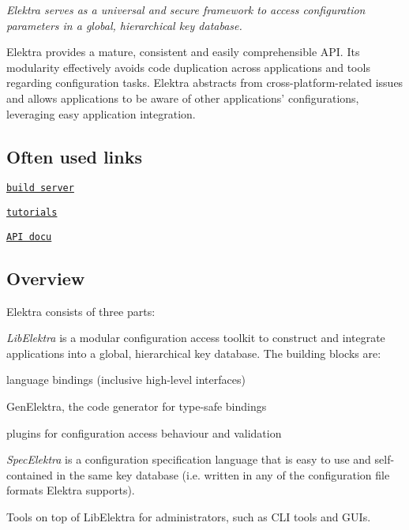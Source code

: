 {\itshape Elektra serves as a universal and secure framework to access configuration parameters in a global, hierarchical key database.}



Elektra provides a mature, consistent and easily comprehensible A\+P\+I. Its modularity effectively avoids code duplication across applications and tools regarding configuration tasks. Elektra abstracts from cross-\/platform-\/related issues and allows applications to be aware of other applications' configurations, leveraging easy application integration.

\subsection*{Often used links}


\begin{DoxyItemize}
\item \href{http://build.libelektra.org:8080/}{\tt build server}
\item \href{http://git.libelektra.org/blob/master/doc/tutorials/}{\tt tutorials}
\item \href{http://doc.libelektra.org/api/latest/html/}{\tt A\+P\+I docu}
\end{DoxyItemize}

\subsection*{Overview}

Elektra consists of three parts\+:


\begin{DoxyEnumerate}
\item {\itshape Lib\+Elektra} is a modular configuration access toolkit to construct and integrate applications into a global, hierarchical key database. The building blocks are\+:
\begin{DoxyItemize}
\item language bindings (inclusive high-\/level interfaces)
\item Gen\+Elektra, the code generator for type-\/safe bindings
\item plugins for configuration access behaviour and validation
\end{DoxyItemize}
\item {\itshape Spec\+Elektra} is a configuration specification language that is easy to use and self-\/contained in the same key database (i.\+e. written in any of the configuration file formats Elektra supports).
\item Tools on top of Lib\+Elektra for administrators, such as C\+L\+I tools and G\+U\+Is.
\end{DoxyEnumerate}

